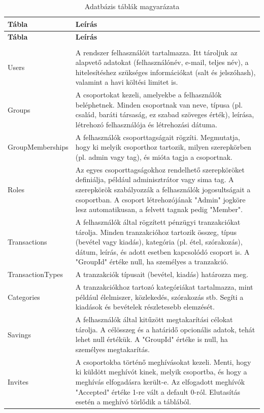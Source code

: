 \begin{longtable}{ | m{} | m{} | }
	\hline
	\textbf{Tábla} & \textbf{Leírás} \\
	\hline
	\endfirsthead
	
	\hline
	\textbf{Tábla} & \textbf{Leírás} \\
	\hline
	\endhead
	
	\hline
	\endfoot
	
	\hline
	\caption{Adatbázis táblák magyarázata} \label{tab:db-desc} \\
	\endlastfoot
	
	Users & A rendszer felhasználóit tartalmazza. Itt tároljuk az alapvető adatokat (felhasználónév, e-mail, teljes név), a hitelesítéshez szükséges információkat (salt és jelszóhash), valamint a havi költési limitet is. \\
	\hline
	Groups & A csoportokat kezeli, amelyekbe a felhasználók beléphetnek. Minden csoportnak van neve, típusa (pl. család, baráti társaság, ez szabad szöveges érték), leírása, létrehozó felhasználója és létrehozási dátuma. \\
	\hline
	GroupMemberships & A felhasználók csoporttagságait rögzíti. Megmutatja, hogy ki melyik csoporthoz tartozik, milyen szerepkörben (pl. admin vagy tag), és mióta tagja a csoportnak. \\
	\hline
	Roles & Az egyes csoporttagságokhoz rendelhető szerepköröket definiálja, például adminisztrátor vagy sima tag. A szerepkörök szabályozzák a felhasználók jogosultságait a csoportban. A csoport létrehozójának "Admin" jogköre lesz automatikusan, a felvett tagnak pedig "Member".\\
	\hline
	Transactions & A felhasználók által rögzített pénzügyi tranzakciókat tárolja. Minden tranzakcióhoz tartozik összeg, típus (bevétel vagy kiadás), kategória (pl. étel, szórakozás), dátum, leírás, és adott esetben kapcsolódó csoport is. A "GroupId" értéke null, ha személyes a tranzakció. \\
	\hline
	TransactionTypes & A tranzakciók típusait (bevétel, kiadás) határozza meg. \\
	\hline
	Categories & A tranzakciókhoz tartozó kategóriákat tartalmazza, mint például élelmiszer, közlekedés, szórakozás stb. Segíti a kiadások és bevételek részletesebb elemzését. \\
	\hline
	Savings & A felhasználók által kitűzött megtakarítási célokat tárolja. A célösszeg és a határidő opcionális adatok, tehát lehet null értékük. A "GroupId" értéke is null, ha személyes megtakarítás. \\
	\hline
	Invites & A csoportokba történő meghívásokat kezeli. Menti, hogy ki küldött meghívót kinek, melyik csoportba, és hogy a meghívás elfogadásra került-e. Az elfogadott meghívók "Accepted" értéke 1-re vált a default 0-ról. Elutasítás esetén a meghívó törlődik a táblából. \\
\end{longtable}



